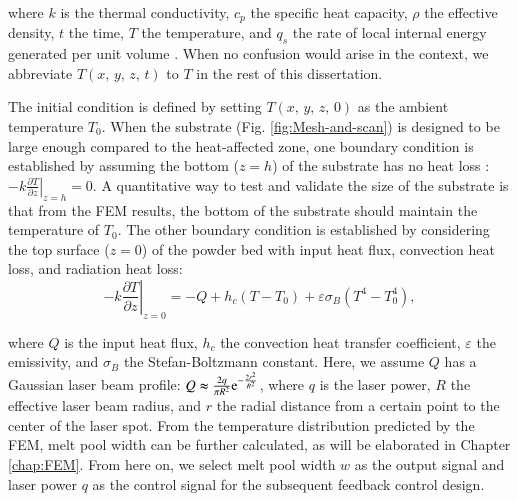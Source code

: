 \documentclass [11pt, proquest] {uwthesis}[2020/02/24]
\begin{document}
\noindent where $k$ is the thermal conductivity, $c_{p}$ the specific
heat capacity, $\rho$ the effective density, $t$ the time, $T$
the temperature, and $q_{s}$ the rate of local internal energy generated
per unit volume \cite{kannatey2009principles}. When no confusion
would arise in the context, we abbreviate $T(x,\,y,\,z,\,t)$ to $T$
in the rest of this dissertation.

The initial condition is defined by setting $T(x,\,y,\,z,\,0)$ as
the ambient temperature $T_{0}$. When the substrate (Fig. \ref{fig:Mesh-and-scan})
is designed to be large enough compared to the heat-affected zone,
one boundary condition is established by assuming the bottom ($z=h$)
of the substrate has no heat loss \cite{masoomi2017laser,hussein2013finite,foroozmehr2016finite}:
$\left.-k\frac{\partial T}{\partial z}\right\vert _{z=h}=0$. A quantitative
way to test and validate the size of the substrate is that from the
FEM results, the bottom of the substrate should maintain the temperature
of $T_{0}$. The other boundary condition is established by considering
the top surface ($z=0$) of the powder bed with input heat flux, convection
heat loss, and radiation heat loss:
\begin{equation}
\left.-k\frac{\partial T}{\partial z}\right\vert _{z=0}=-Q+h_{c}(T-T_{0})+\varepsilon\sigma_{B}(T^{4}-T_{0}^{4}),\label{eq:first_one_boundary}
\end{equation}

\noindent where $Q$ is the input heat flux, $h_{c}$ the convection
heat transfer coefficient, $\varepsilon$ the emissivity, and $\sigma_{B}$
the Stefan-Boltzmann constant. Here, we assume $Q$ has a Gaussian
laser beam profile: $Q\thickapprox\frac{2q}{\pi R^{2}}\text{e}^{-\frac{2r^{2}}{R^{2}}}$,
where $q$ is the laser power, $R$ the effective laser beam radius,
and $r$ the radial distance from a certain point to the center of
the laser spot. From the temperature distribution predicted by the
FEM, melt pool width can be further calculated, as will be elaborated
in Chapter \ref{chap:FEM}. From here on, we select melt pool width
$w$ as the output signal and laser power $q$ as the control signal
for the subsequent feedback control design. 
\end{document}
